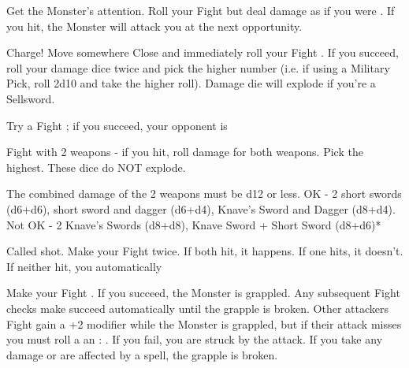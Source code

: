 {  

  Get the Monster's attention.  Roll your Fight \RO but deal damage as if you were .   If you hit, the Monster will attack you at the next opportunity.


  Charge!  Move somewhere Close and immediately roll your Fight \RO. If you succeed, roll your damage dice twice and pick the higher number (i.e. if using a Military Pick, roll 2d10 and take the higher roll).  Damage die will explode if you're a Sellsword. 


  Try a Fight \RO; if you succeed, your opponent is 


  Fight with 2 weapons - if you hit, roll damage for both weapons.  Pick the highest. These dice do NOT explode.

  The combined damage of the 2 weapons must be d12 or less.  OK - 2 short swords (d6+d6), short sword and dagger (d6+d4), Knave's Sword and Dagger (d8+d4).  Not OK - 2 Knave's Swords (d8+d8), Knave Sword + Short Sword (d8+d6)*


  Called shot.  Make your Fight \RO twice.  If both hit, it happens.  If one hits, it doesn't.  If neither hit, you automatically 



  Make your Fight \RO.  If you succeed, the Monster is grappled.  Any subsequent Fight checks  make succeed automatically until the grapple is broken.  Other attackers Fight \RO gain a +2 modifier while the Monster is grappled, but if their attack misses you must roll a an \RS : \DEX.  If you fail, you are struck by the attack.  If you take any damage or are affected by a spell, the grapple is broken.


}
